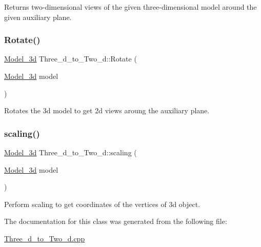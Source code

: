 Returns two-\/dimensional views of the given three-\/dimensional model around the given auxiliary plane. \mbox{\label{class_three__d__to___two__d_a70ef362316e790dfdbee41fc4b8f5576}} 
\subsubsection{\texorpdfstring{Rotate()}{Rotate()}}
{\footnotesize\ttfamily \hyperlink{class_model__3d}{Model\+\_\+3d} Three\+\_\+d\+\_\+to\+\_\+\+Two\+\_\+d\+::\+Rotate (\begin{DoxyParamCaption}\item[{\hyperlink{class_model__3d}{Model\+\_\+3d}}]{model }\end{DoxyParamCaption})}

Rotates the 3d model to get 2d views aroung the auxiliary plane. \mbox{\label{class_three__d__to___two__d_a4172439cbbc929c71679bc89a7603234}} 
\subsubsection{\texorpdfstring{scaling()}{scaling()}}
{\footnotesize\ttfamily \hyperlink{class_model__3d}{Model\+\_\+3d} Three\+\_\+d\+\_\+to\+\_\+\+Two\+\_\+d\+::scaling (\begin{DoxyParamCaption}\item[{\hyperlink{class_model__3d}{Model\+\_\+3d}}]{model }\end{DoxyParamCaption})}

Perform scaling to get coordinates of the vertices of 3d object. 

The documentation for this class was generated from the following file\+:\begin{DoxyCompactItemize}
\item 
\hyperlink{_three__d__to___two__d_8cpp}{Three\+\_\+d\+\_\+to\+\_\+\+Two\+\_\+d.\+cpp}\end{DoxyCompactItemize}
